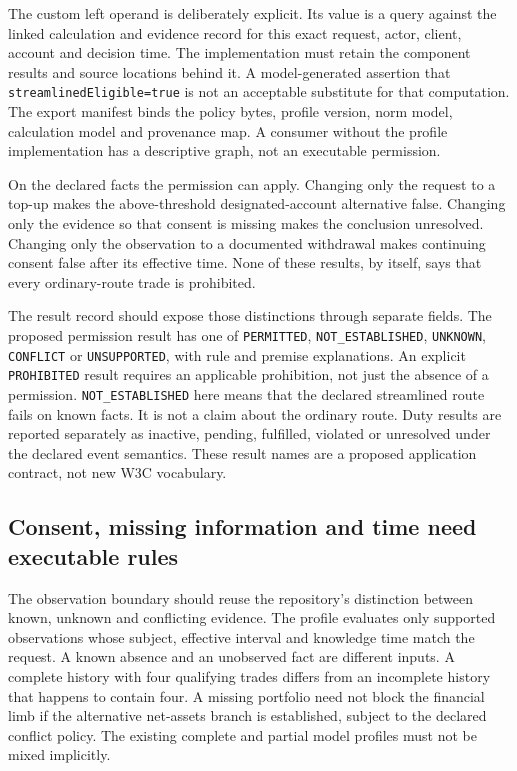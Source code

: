 The custom left operand is deliberately explicit. Its value is a query against
the linked calculation and evidence record for this exact request, actor,
client, account and decision time. The implementation must retain the
component results and source locations behind it. A model-generated assertion
that \texttt{streamlinedEligible=true} is not an acceptable substitute for
that computation. The export manifest binds the policy bytes, profile version,
norm model, calculation model and provenance map. A consumer without the
profile implementation has a descriptive graph, not an executable permission.

On the declared facts the permission can apply. Changing only the request to
a top-up makes the above-threshold designated-account alternative false.
Changing only the evidence so that consent is missing makes the conclusion
unresolved. Changing only the observation to a documented withdrawal makes
continuing consent false after its effective time. None of these results,
by itself, says that every ordinary-route trade is prohibited.

The result record should expose those distinctions through separate fields.
The proposed permission result has one of \texttt{PERMITTED},
\texttt{NOT\_ESTABLISHED}, \texttt{UNKNOWN}, \texttt{CONFLICT} or
\texttt{UNSUPPORTED}, with rule and premise explanations. An explicit
\texttt{PROHIBITED} result requires an applicable prohibition, not just the
absence of a permission. \texttt{NOT\_ESTABLISHED} here means that the declared
streamlined route fails on known facts. It is not a claim about the ordinary
route. Duty results are reported separately as inactive, pending, fulfilled,
violated or unresolved under the declared event semantics. These result names
are a proposed application contract, not new W3C vocabulary.

\subsection{Consent, missing information and time need executable rules}

The observation boundary should reuse the repository's distinction between
known, unknown and conflicting evidence. The profile evaluates only supported
observations whose subject, effective interval and knowledge time match the
request. A known absence and an unobserved fact are different inputs. A
complete history with four qualifying trades differs from an incomplete
history that happens to contain four. A missing portfolio need not block the
financial limb if the alternative net-assets branch is established, subject
to the declared conflict policy. The existing complete and partial model
profiles must not be mixed implicitly.

